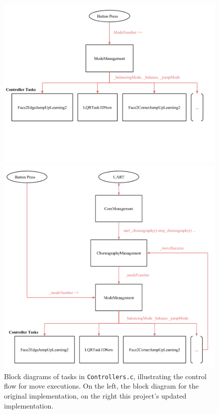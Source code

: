 \begin{figure}[ht]
  \begin{minipage}[t]{0.48\textwidth}
    \includegraphics[width = \textwidth]{img/Controllers.png}
  \end{minipage}
  \hfill
  \begin{minipage}[t]{0.48\textwidth}
    \includegraphics[width = \textwidth]{img/ControllersChoreography.png}
  \end{minipage}
  \caption{Block diagrams of tasks in \texttt{Controllers.c}, illustrating the control flow for move executions. On the left, the block diagram for the original implementation, on the right this project's updated implementation.}
  \label{img:Controllers}
\end{figure}


